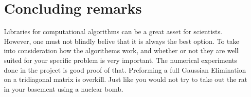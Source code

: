 \documentclass[11pt,a4paper,english]{article}
\numberwithin{equation}{section}
\begin{document}
\section{Concluding remarks}

Libraries for computational algorithms can be a great asset for scientists. However, one must not blindly belive that it is always the best option. To take into consideration how the algorithems work, and whether or not they are well suited for your specific problem is very important. The numerical experiments done in the project is good proof of that. Preforming a full Gaussian Elimination on a tridiagonal matrix is overkill. Just like you would not try to take out the rat in your basement using a nuclear bomb. 
\end{document}
